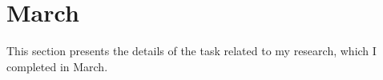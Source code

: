 \chapter{March}
\label{chap:Mar}


This section presents the details of the task related to my research, which I completed in March.

% 
% 
% 
% 

